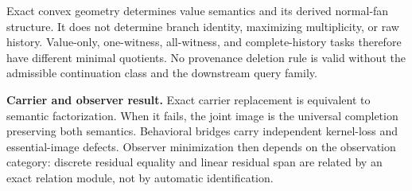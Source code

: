 \begin{boundary}
\label{bnd:block18-provenance-boundary}
Exact convex geometry determines value semantics and its derived normal-fan structure.  It does not determine branch identity, maximizing multiplicity, or raw history.  Value-only, one-witness, all-witness, and complete-history tasks therefore have different minimal quotients.  No provenance deletion rule is valid without the admissible continuation class and the downstream query family.
\end{boundary}

\begin{resultbox}
\textbf{Carrier and observer result.}
Exact carrier replacement is equivalent to semantic factorization.  When it fails, the joint image is the universal completion preserving both semantics.  Behavioral bridges carry independent kernel-loss and essential-image defects.  Observer minimization then depends on the observation category: discrete residual equality and linear residual span are related by an exact relation module, not by automatic identification.
\end{resultbox}
